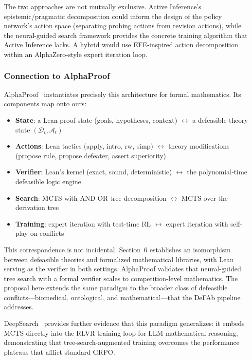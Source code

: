 \documentclass[11pt]{article}
\newcommand{\D}{\mathcal{D}}
\begin{document}
The two approaches are not mutually exclusive. Active Inference's epistemic/pragmatic decomposition could inform the design of the policy network's action space (separating probing actions from revision actions), while the neural-guided search framework provides the concrete training algorithm that Active Inference lacks. A hybrid would use EFE-inspired action decomposition within an AlphaZero-style expert iteration loop.

\subsubsection{Connection to AlphaProof}

AlphaProof~\cite{alphaproof2025} instantiates precisely this architecture for formal mathematics. Its components map onto ours:

\begin{itemize}[nosep]
    \item \textbf{State}: a Lean proof state (goals, hypotheses, context) $\leftrightarrow$ a defeasible theory state $(\D_t, \mathcal{A}_t)$
    \item \textbf{Actions}: Lean tactics (apply, intro, rw, simp) $\leftrightarrow$ theory modifications (propose rule, propose defeater, assert superiority)
    \item \textbf{Verifier}: Lean's kernel (exact, sound, deterministic) $\leftrightarrow$ the polynomial-time defeasible logic engine
    \item \textbf{Search}: MCTS with AND-OR tree decomposition $\leftrightarrow$ MCTS over the derivation tree
    \item \textbf{Training}: expert iteration with test-time RL $\leftrightarrow$ expert iteration with self-play on conflicts
\end{itemize}

This correspondence is not incidental. Section~6 establishes an isomorphism between defeasible theories and formalized mathematical libraries, with Lean serving as the verifier in both settings. AlphaProof validates that neural-guided tree search with a formal verifier scales to competition-level mathematics. The proposal here extends the same paradigm to the broader class of defeasible conflicts---biomedical, ontological, and mathematical---that the DeFAb pipeline addresses.

DeepSearch~\cite{deepsearch2026} provides further evidence that this paradigm generalizes: it embeds MCTS directly into the RLVR training loop for LLM mathematical reasoning, demonstrating that tree-search-augmented training overcomes the performance plateaus that afflict standard GRPO.
\end{document}
